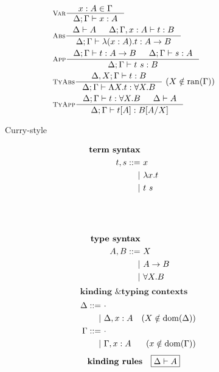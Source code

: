 \begin{figure}
\begin{singlespace}
\begin{minipage}{.46\textwidth}
\vspace*{-1em}
\begin{align*}
& \inference[\sc Var]{x:A \in \Gamma}{\Delta;\Gamma |- x:A} \\
& \inference[\sc Abs]{\Delta |- A & \Delta;\Gamma,x:A |- t : B}
	             {\Delta;\Gamma |- \l(x:A).t : A -> B} \\
& \inference[\sc App]{\Delta;\Gamma |- t : A -> B & \Delta;\Gamma |- s : A}
		     {\Delta;\Gamma |- t~s : B} \\
& \inference[\sc TyAbs]{\Delta,X;\Gamma |- t : B}
		       {\Delta;\Gamma |- \L X.t : \forall X.B} ~
		       (X\notin\ran(\Gamma)) \\
& \inference[\sc TyApp]{\Delta;\Gamma |- t : \forall X.B & \Delta |- A}
		       {\Delta;\Gamma |- t[A] : B[A/X]}
\end{align*}
\end{minipage}
\begin{minipage}{.46\textwidth}
	\begin{center}Curry-style\end{center}
\def\baselinestretch{0}
\small
\begin{align*}
\textbf{term syntax} \\
t,s ::= &~ x           \\
      | &~ \lambda x    . t \\
      | &~ t ~ s       \\
      \phantom{|} &~ \\
      \phantom{|} &~ \\
\\
\textbf{type syntax} \\
A,B ::= &~ X \\
      | &~ A -> B \\
      | &~ \forall X . B \\
\end{align*}
\[ \textbf{kinding \& typing contexts} \]\vspace*{-1em}
\begin{align*}\quad
\Delta ::= &~ \cdot \\
	 | &~ \Delta, x:A & (X\notin \mathop{\mathrm{dom}}(\Delta)) \\
\Gamma ::= &~ \cdot \\
	 | &~ \Gamma, x:A & (x\notin \mathop{\mathrm{dom}}(\Gamma)) \\
\end{align*}
\[ \textbf{kinding rules} \quad \framebox{$ \Delta |- A $}\]\vspace*{-1em}
\begin{align*}

\end{align*}
\end{minipage}
\end{singlespace}
\end{figure}
